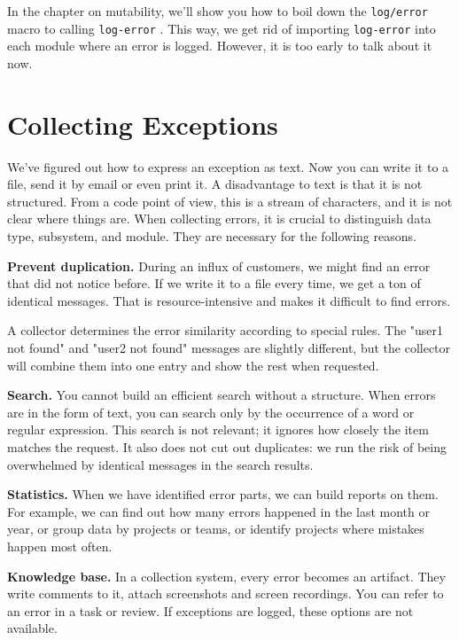 In the chapter on mutability, we'll show you how to boil down the \verb|log/error| macro to calling \verb|log-error| . This way, we get rid of importing \verb|log-error| into each module where an error is logged. However, it is too early to talk about it now.

\section{Collecting Exceptions}


We've figured out how to express an exception as text. Now you can write it to a file, send it by email or even print it. A disadvantage to text is that it is not structured. From a code point of view, this is a stream of characters, and it is not clear where things are. When collecting errors, it is crucial to distinguish data type, subsystem, and module. They are necessary for the following reasons.

\textbf{Prevent duplication.} During an influx of customers, we might find an error that did not notice before. If we write it to a file every time, we get a ton of identical messages. That is resource-intensive and makes it difficult to find errors.

A collector determines the error similarity according to special rules. The "user1 not found" and "user2 not found" messages are slightly different, but the collector will combine them into one entry and show the rest when requested.

\textbf{Search.} You cannot build an efficient search without a structure.
When errors are in the form of text, you can search only by the occurrence of a word or regular expression. This search is not relevant; it ignores how closely the item matches the request. It also does not cut out duplicates: we run the risk of being overwhelmed by identical messages in the search results.

\textbf{Statistics.} When we have identified error parts, we can build reports on them. For example, we can find out how many errors happened in the last month or year, or group data by projects or teams, or identify projects where mistakes happen most often.

\textbf{Knowledge base.} In a collection system, every error becomes an artifact. They write comments to it, attach screenshots and screen recordings. You can refer to an error in a task or review. If exceptions are logged, these options are not available.


